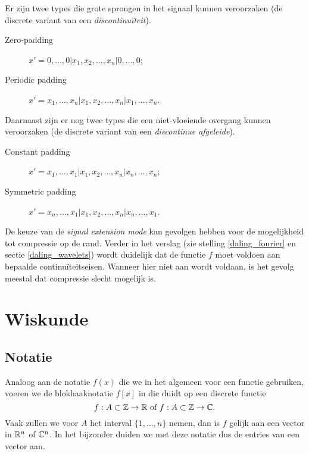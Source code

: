 Er zijn twee types die grote sprongen in het signaal kunnen veroorzaken (de discrete variant van een \emph{discontinu\"iteit}).
\begin{description}
\item[Zero-padding] $x' = 0, \ldots, 0| x_1, x_2, \ldots, x_n| 0, \ldots, 0$;
\item[Periodic padding] $x' = x_1, \ldots, x_n| x_1, x_2, \ldots, x_n| x_1, \ldots, x_n$.
\end{description}
Daarnaast zijn er nog twee types die een niet-vloeiende overgang kunnen veroorzaken (de discrete variant van een \emph{discontinue afgeleide}).
\begin{description}
\item[Constant padding] $x' = x_1, \ldots, x_1| x_1, x_2, \ldots, x_n| x_n, \ldots, x_n$;
\item[Symmetric padding] $x' = x_n, \ldots, x_1| x_1, x_2, \ldots, x_n| x_n, \ldots, x_1$.
\end{description}

De keuze van de \emph{signal extension mode} kan gevolgen hebben voor de mogelijkheid tot compressie op de rand. Verder in het verslag (zie stelling \ref{daling_fourier} en sectie \ref{daling_wavelets}) wordt duidelijk dat de functie $f$ moet voldoen aan bepaalde continu\"iteitseisen. Wanneer hier niet aan wordt voldaan, is het gevolg meestal dat compressie slecht mogelijk is.

\section{Wiskunde}

\subsection{Notatie}
Analoog aan de notatie $f(x)$ die we in het algemeen voor een functie gebruiken, voeren we de blokhaaknotatie $f[x]$ in die duidt op een discrete functie
\[
f:A\subset \mathbb{Z}\to \mathbb{R} \text{ of } f:A\subset \mathbb{Z}\to \mathbb{C}.  
\]
Vaak zullen we voor $A$ het interval $\{1,\ldots,n\}$ nemen, 
dan is $f$ gelijk aan een vector in $\mathbb{R}^n$ of $\mathbb{C}^n$.
In het bijzonder duiden we met deze notatie dus de entries van een vector aan.

